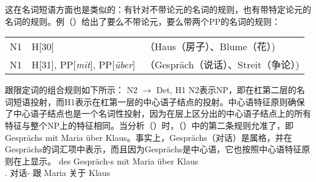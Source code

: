 这在名词短语方面也是类似的：有针对不带论元的名词的规则，也有带特定论元的名词的规则。例（）给出了要么不带论元，要么带两个PP的名词的规则\citep*[]{GKPS85a}：
\ea
\begin{tabular}[t]{@{}l@{~$\to$~}ll@{}}
N1 & H[30] &（Haus（房子）、Blume（花）)\\
N1 & H[31], PP[\emph{mit}], PP[\emph{über}] &（Gespräch（说话）、Streit（争论）)\\
\end{tabular}
\z
\nbarc 跟限定词的组合规则如下所示：
\ea
N2 $\to$ Det, H1
\z
N2表示NP，即在杠第二层的名词短语投射，而H1表示在杠第一层的中心语子结点的投射。中心语特征原则确保了中心语子结点也是一个名词性投射，因为在\xbarc 层上区分出的中心语子结点上的所有特征与整个NP上的特征相同。当分析（）时，（）中的第二条规则允准了\nbarc，即Gesprächs mit Maria über Klaus。事实上，Gesprächs（对话）是属格，并在Gesprächs的词汇项中表示，而且因为Gesprächs是中心语，它也按照中心语特征原则在\nbarc 上显示。
\ea
\gll des Gespräch-s mit Maria über Klaus\\
	 .\gen{} 对话-\gen{} 跟 Maria 关于 Klaus\\
